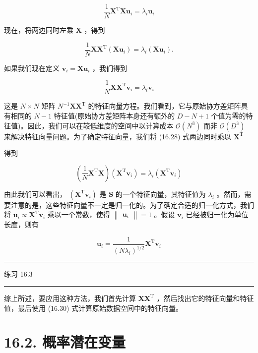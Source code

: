 \documentclass[10pt]{article}
\newcommand{\HRule}{\begin{center}\rule{0.9\linewidth}{0.2mm}\end{center}}
\begin{document}
\[
\frac{1}{N}{\mathbf{X}}^{\mathrm{T}}\mathbf{X}{\mathbf{u}}_{i} = {\lambda }_{i}{\mathbf{u}}_{i} \tag{16.26}
\]

现在，将两边同时左乘 \(\mathbf{X}\) ，得到

\[
\frac{1}{N}\mathbf{X}{\mathbf{X}}^{\mathrm{T}}\left( {\mathbf{X}{\mathbf{u}}_{i}}\right)  = {\lambda }_{i}\left( {\mathbf{X}{\mathbf{u}}_{i}}\right) . \tag{16.27}
\]

如果我们现在定义 \({\mathbf{v}}_{i} = \mathbf{X}{\mathbf{u}}_{i}\) ，我们得到

\[
\frac{1}{N}\mathbf{X}{\mathbf{X}}^{\mathrm{T}}{\mathbf{v}}_{i} = {\lambda }_{i}{\mathbf{v}}_{i} \tag{16.28}
\]

这是 \(N \times  N\) 矩阵 \({N}^{-1}\mathbf{X}{\mathbf{X}}^{\mathrm{T}}\) 的特征向量方程。我们看到，它与原始协方差矩阵具有相同的 \(N - 1\) 特征值(原始协方差矩阵本身还有额外的 \(D - N + 1\) 个值为零的特征值)。因此，我们可以在较低维度的空间中以计算成本 \(\mathcal{O}\left( {N}^{3}\right)\) 而非 \(\mathcal{O}\left( {D}^{3}\right)\) 来解决特征向量问题。为了确定特征向量，我们将 (16.28) 式两边同时乘以 \({\mathbf{X}}^{\mathrm{T}}\)

得到

\[
\left( {\frac{1}{N}{\mathbf{X}}^{\mathrm{T}}\mathbf{X}}\right) \left( {{\mathbf{X}}^{\mathrm{T}}{\mathbf{v}}_{i}}\right)  = {\lambda }_{i}\left( {{\mathbf{X}}^{\mathrm{T}}{\mathbf{v}}_{i}}\right)  \tag{16.29}
\]

由此我们可以看出， \(\left( {{\mathbf{X}}^{\mathrm{T}}{\mathbf{v}}_{i}}\right)\) 是 \(\mathbf{S}\) 的一个特征向量，其特征值为 \({\lambda }_{i}\) 。然而，需要注意的是，这些特征向量不一定是归一化的。为了确定合适的归一化方式，我们将 \({\mathbf{u}}_{i} \propto  {\mathbf{X}}^{\mathrm{T}}{\mathbf{v}}_{i}\) 乘以一个常数，使得 \(\begin{Vmatrix}{\mathbf{u}}_{i}\end{Vmatrix} = 1\) 。假设 \({\mathbf{v}}_{i}\) 已经被归一化为单位长度，则有

\[
{\mathbf{u}}_{i} = \frac{1}{{\left( N{\lambda }_{i}\right) }^{1/2}}{\mathbf{X}}^{\mathrm{T}}{\mathbf{v}}_{i} \tag{16.30}
\]

\HRule

练习 16.3

\HRule

综上所述，要应用这种方法，我们首先计算 \(\mathbf{X}{\mathbf{X}}^{\mathrm{T}}\) ，然后找出它的特征向量和特征值，最后使用 (16.30) 式计算原始数据空间中的特征向量。

\section*{16.2. 概率潜在变量}
\end{document}
